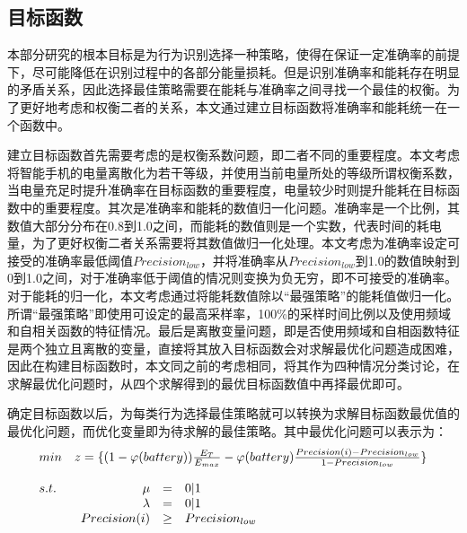 \subsection{目标函数}
\par 本部分研究的根本目标是为行为识别选择一种策略，使得在保证一定准确率的前提下，尽可能降低在识别过程中的各部分能量损耗。但是识别准确率和能耗存在明显的矛盾关系，因此选择最佳策略需要在能耗与准确率之间寻找一个最佳的权衡。为了更好地考虑和权衡二者的关系，本文通过建立目标函数将准确率和能耗统一在一个函数中。
\par 建立目标函数首先需要考虑的是权衡系数问题，即二者不同的重要程度。本文考虑将智能手机的电量离散化为若干等级，并使用当前电量所处的等级所谓权衡系数，当电量充足时提升准确率在目标函数的重要程度，电量较少时则提升能耗在目标函数中的重要程度。其次是准确率和能耗的数值归一化问题。准确率是一个比例，其数值大部分分布在0.8到1.0之间，而能耗的数值则是一个实数，代表时间的耗电量，为了更好权衡二者关系需要将其数值做归一化处理。本文考虑为准确率设定可接受的准确率最低阈值$Precision_{low}$，并将准确率从$Precision_{low}$到1.0的数值映射到0到1.0之间，对于准确率低于阈值的情况则变换为负无穷，即不可接受的准确率。对于能耗的归一化，本文考虑通过将能耗数值除以“最强策略”的能耗值做归一化。所谓“最强策略”即使用可设定的最高采样率，100\%的采样时间比例以及使用频域和自相关函数的特征情况。最后是离散变量问题，即是否使用频域和自相函数特征是两个独立且离散的变量，直接将其放入目标函数会对求解最优化问题造成困难，因此在构建目标函数时，本文同之前的考虑相同，将其作为四种情况分类讨论，在求解最优化问题时，从四个求解得到的最优目标函数值中再择最优即可。
\par 确定目标函数以后，为每类行为选择最佳策略就可以转换为求解目标函数最优值的最优化问题，而优化变量即为待求解的最佳策略。其中最优化问题可以表示为：
\begin{equation}
  \begin{array}{ll}
    min  & z=\{(1-\varphi (battery)) \frac{E_T}{E_{max}} - \varphi (battery) \frac{Precision(i) - Precision_{low}}{1 - Precision_{low}}\} \\
    \\
    s.t. & \begin{array}[t]{rll}
             \mu 			 &  =    & 0|1 \\
             \lambda         &  =    & 0|1  \\
             Precision(i)    & \geq  & Precision_{low}
           \end{array}
  \end{array}
\end{equation}

